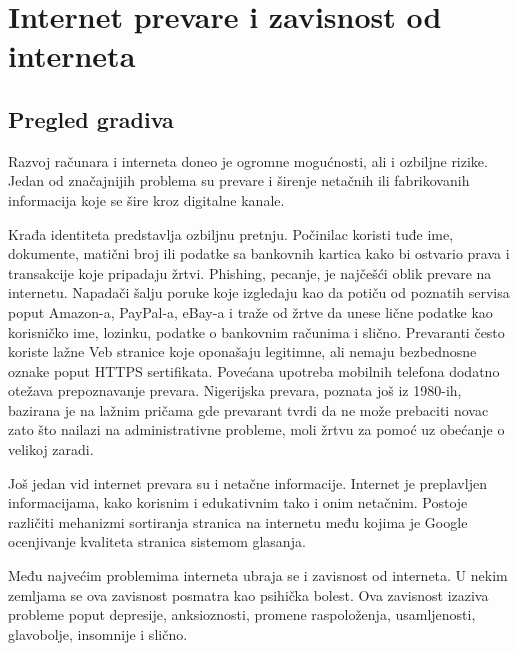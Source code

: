 \documentclass[12pt]{article}
\begin{document}
\section{Internet prevare i zavisnost od interneta}
\subsection{Pregled gradiva}
Razvoj računara i interneta doneo je ogromne mogućnosti, ali i ozbiljne rizike. Jedan od značajnijih problema su prevare i širenje netačnih ili fabrikovanih informacija koje se šire kroz digitalne kanale.

Krađa identiteta predstavlja ozbiljnu pretnju. Počinilac koristi tuđe ime, dokumente, matični broj ili podatke sa bankovnih kartica kako bi ostvario prava i transakcije koje pripadaju žrtvi.
Phishing, pecanje, je najčešći oblik prevare na internetu. Napadači šalju poruke koje izgledaju kao da potiču od poznatih servisa poput Amazon-a, PayPal-a, eBay-a i traže od žrtve da unese lične podatke kao korisničko ime, lozinku, podatke o bankovnim računima i slično.
Prevaranti često koriste lažne Veb stranice koje oponašaju legitimne, ali nemaju bezbednosne oznake poput HTTPS sertifikata. Povećana upotreba mobilnih telefona dodatno otežava prepoznavanje prevara.
Nigerijska prevara, poznata još iz 1980-ih, bazirana je na lažnim pričama gde prevarant tvrdi da ne može prebaciti novac zato što nailazi na administrativne probleme, moli žrtvu za pomoć uz obećanje o velikoj zaradi.

Još jedan vid internet prevara su i netačne informacije. Internet je preplavljen informacijama, kako korisnim i edukativnim tako i onim netačnim. Postoje različiti mehanizmi sortiranja stranica na internetu među kojima je Google ocenjivanje kvaliteta stranica sistemom glasanja.

Među najvećim problemima interneta ubraja se i zavisnost od interneta. U nekim zemljama se ova zavisnost posmatra kao psihička bolest. Ova zavisnost izaziva probleme poput depresije, anksioznosti, promene raspoloženja, usamljenosti, glavobolje, insomnije i slično.
\end{document}
